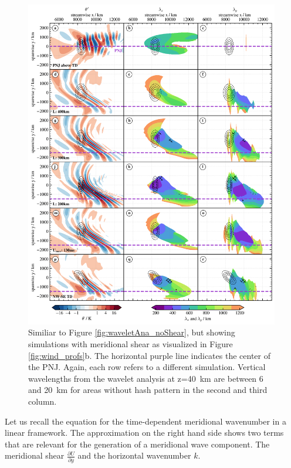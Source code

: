 \begin{figure}[tbp]
    \centering
    \includegraphics[width=0.99\textwidth]{figures_3D/waveletAna_overview.png}
    \caption{Similiar to Figure \ref{fig:waveletAna_noShear}, but showing simulations with meridional shear as visualized in Figure \ref{fig:wind_profs}b. The horizontal purple line indicates the center of the PNJ. Again, each row refers to a different simulation. Vertical wavelengths from the wavelet analysis at z=\SI{40}{\kilo\meter} are between 6 and \SI{20}{\kilo\meter} for areas without hash pattern in the second and third column.}
    \label{fig:waveletAna}
\end{figure}

Let us recall the equation for the time-dependent meridional wavenumber in a linear framework. The approximation on the right hand side shows two terms that are relevant for the generation of a meridional wave component. The meridional shear $\frac{\partial U}{\partial y}$ and the horizontal wavenumber $k$.


